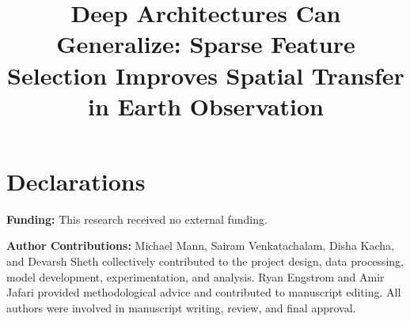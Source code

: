 \documentclass[pdflatex,sn-mathphys]{sn-jnl} %
\begin{document}
\title[Deep Architectures Can Generalize]{Deep Architectures Can Generalize: Sparse Feature Selection Improves Spatial Transfer in Earth Observation}
\makeatletter
\renewcommand{\@makefnmark}{\textsuperscript{*}}
\renewcommand{\footnoterule}{
  \kern -3pt
  \hrule width 2cm height 0.4pt
  \kern 2.6pt
}
\makeatother
{}
\author[2]{ }
\author[1]{ }
\author[1]{ }
\author[1]{ }
\author[2]{ }
\author[2]{ }

\maketitle
\section*{Declarations}

\textbf{Funding:} This research received no external funding.

\noindent\textbf{Author Contributions:} Michael Mann, Sairam Venkatachalam, Disha Kacha, and Devarsh Sheth collectively contributed to the project design, data processing, model development, experimentation, and analysis. Ryan Engstrom and Amir Jafari provided methodological advice and contributed to manuscript editing. All authors were involved in manuscript writing, review, and final approval.
\end{document}
